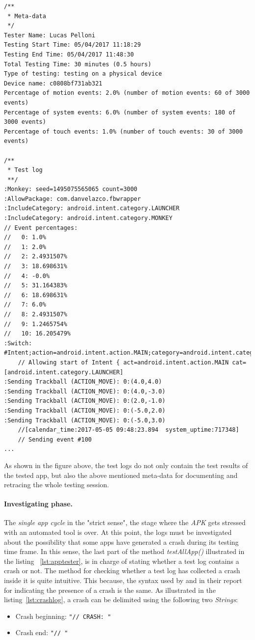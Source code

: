 \begin{lstlisting}[caption=Test log of com.danvelazco.fbwrapper, basicstyle=\fontsize{7}{8}\ttfamily,label={lst:testinglog}]
/**
 * Meta-data
 */
Tester Name: Lucas Pelloni
Testing Start Time: 05/04/2017 11:18:29
Testing End Time: 05/04/2017 11:48:30
Total Testing Time: 30 minutes (0.5 hours)
Type of testing: testing on a physical device
Device name: c0808bf731ab321
Percentage of motion events: 2.0% (number of motion events: 60 of 3000 events)
Percentage of system events: 6.0% (number of system events: 180 of 3000 events)
Percentage of touch events: 1.0% (number of touch events: 30 of 3000 events)

/**
 * Test log 
 **/
:Monkey: seed=1495075565065 count=3000
:AllowPackage: com.danvelazco.fbwrapper
:IncludeCategory: android.intent.category.LAUNCHER
:IncludeCategory: android.intent.category.MONKEY
// Event percentages:
//   0: 1.0%
//   1: 2.0%
//   2: 2.4931507%
//   3: 18.698631%
//   4: -0.0%
//   5: 31.164383%
//   6: 18.698631%
//   7: 6.0%
//   8: 2.4931507%
//   9: 1.2465754%
//   10: 16.205479%
:Switch: #Intent;action=android.intent.action.MAIN;category=android.intent.category.LAUNCHER;end
    // Allowing start of Intent { act=android.intent.action.MAIN cat=[android.intent.category.LAUNCHER]
:Sending Trackball (ACTION_MOVE): 0:(4.0,4.0)
:Sending Trackball (ACTION_MOVE): 0:(4.0,-3.0)
:Sending Trackball (ACTION_MOVE): 0:(2.0,-1.0)
:Sending Trackball (ACTION_MOVE): 0:(-5.0,2.0)
:Sending Trackball (ACTION_MOVE): 0:(-5.0,3.0)
    //[calendar_time:2017-05-05 09:48:23.894  system_uptime:717348]
    // Sending event #100
...
\end{lstlisting}

As shown in the figure above, the test logs do not only contain the test results of the tested app, but also the above mentioned meta-data for documenting and retracing the whole testing session.

\paragraph{Investigating phase. }
The \textit{single app cycle} in the "strict sense", \ie the stage where the \textit{APK} gets stressed with an automated tool is over. At this point, the logs must be investigated about the possibility that some apps have generated a crash during its testing time frame. In this sense, the last part of the method \textit{testAllApp()} illustrated in the listing ~\ref{lst:apptester}, is in charge of stating whether a test log contains a crash or not. The method for checking whether a test log has collected a crash inside it is quite intuitive. This because, the syntax used by \monkey and \sapienz in their report for indicating the presence of a crash is the same. As illustrated in the listing~\ref{lst:crashlog}, a crash can be delimited using the following two \textit{Strings}: 
\begin{itemize}
\item Crash beginning: \texttt{"// CRASH: "}
\item Crash end: \texttt{"// "}
\end{itemize}

